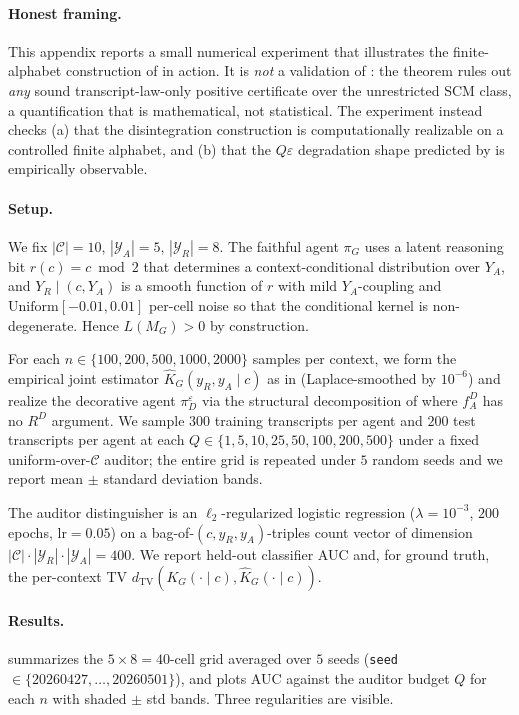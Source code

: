 \documentclass{article}
\theoremstyle{plain}
\theoremstyle{definition}
\theoremstyle{remark}
\newcommand{\TV}{\mathrm{TV}}
\newcommand{\dtv}{d_{\TV}}
\newcommand{\C}{\mathcal{C}}
\newcommand{\YR}{\mathcal{Y}_R}
\newcommand{\YA}{\mathcal{Y}_A}
\begin{document}
\paragraph{Honest framing.}
This appendix reports a small numerical experiment that illustrates the
finite-alphabet construction of  in action. It is
\emph{not} a validation of : the theorem rules out
\emph{any} sound transcript-law-only positive certificate over the unrestricted
SCM class, a quantification that is mathematical, not statistical. The
experiment instead checks (a) that the disintegration construction is
computationally realizable on a controlled finite alphabet, and (b) that the
$Q\varepsilon$ degradation shape predicted by  is empirically
observable.

\paragraph{Setup.}
We fix $|\C| = 10$, $|\YA| = 5$, $|\YR| = 8$. The faithful agent $\pi_G$ uses
a latent reasoning bit $r(c) = c \bmod 2$ that determines a context-conditional
distribution over $Y_A$, and $Y_R \mid (c, Y_A)$ is a smooth function of $r$
with mild $Y_A$-coupling and $\mathrm{Uniform}[-0.01, 0.01]$ per-cell noise so
that the conditional kernel is non-degenerate. Hence $L(M_G) > 0$ by
construction.

For each $n \in \{100, 200, 500, 1000, 2000\}$ samples per context, we
form the empirical joint estimator $\hat K_G(y_R, y_A \mid c)$ as in
 (Laplace-smoothed by $10^{-6}$) and realize
the decorative agent $\pi_D^\varepsilon$ via the structural decomposition
of  where $f_A^D$ has no $R^D$ argument. We
sample $300$ training transcripts per agent and $200$ test transcripts
per agent at each $Q \in \{1, 5, 10, 25, 50, 100, 200, 500\}$ under a
fixed uniform-over-$\C$ auditor; the entire grid is repeated under
$5$ random seeds and we report mean $\pm$ standard deviation bands.

The auditor distinguisher is an $\ell_2$-regularized logistic regression
($\lambda = 10^{-3}$, $200$ epochs, $\mathrm{lr} = 0.05$) on a
bag-of-$(c, y_R, y_A)$-triples count vector of dimension $|\C| \cdot |\YR|
\cdot |\YA| = 400$. We report held-out classifier AUC and, for ground truth,
the per-context TV $\dtv(K_G(\cdot \mid c), \hat K_G(\cdot \mid c))$.

\paragraph{Results.}
 summarizes the $5 \times 8 = 40$-cell grid
averaged over $5$ seeds (\texttt{seed} $\in \{20260427,\ldots,20260501\}$),
and  plots AUC against the auditor budget $Q$ for
each $n$ with shaded $\pm$ std bands.
Three regularities are visible.
\end{document}
